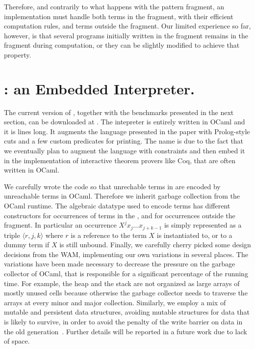 \documentclass{llncs}
\begin{document}
Therefore, and contrarily to what happens with the pattern fragment, an
implementation must handle both terms in the fragment, with their efficient
computation rules, and terms outside the fragment. Our limited experience so
far, however, is that several programs initially written in the fragment
remains in the fragment during computation, or they can be slightly modified
to achieve that property.

\section{\elpi: an Embedded \lp{} Interpreter.}\label{sec:elpi}
The current version of \elpi, together with the benchmarks presented in
the next section, can be downloaded at . The intepreter
is entirely written in OCaml and it is  lines long. It augments the language presented in the paper with Prolog-style cuts and a few custom predicates for printing. The name is due to the fact that we eventually plan to augment the language with constraints and then embed it in the implementation of interactive theorem provers like Coq, that are often written in OCaml.

We carefully wrote the code so that unrechable terms in \lp{} are encoded by unreachable terms in OCaml. Therefore we inherit garbage collection from the OCaml runtime. The algebraic datatype used to encode terms has different constructors for occurrences of terms in the \frag, and for occurrences outside the fragment. In particular an occurrence $X^j x_j \ldots x_{j+k-1}$ is simply represented as a triple $\langle r,j,k\rangle$ where $r$ is a reference to the term
$X$ is instantiated to, or to a dummy term if $X$ is still unbound. Finally, we carefully cherry picked some design decisions from the WAM, implementing our own variations in several places. The variations have been made necessary to decrease the pressure on the garbage collector of OCaml, that is responsible for a significant percentage of the running time. For example, the heap and the stack are not organized as large arrays of mostly unused cells because otherwise the garbage collector needs to traverse the arrays at every minor and major collection. Similarly, we employ a mix of mutable and persistent data structures, avoiding mutable structures for data that is likely to survive, in order to avoid the penalty of the write barrier on data in the old generation~\cite{???}.
Further details will be reported in a future work due to lack of space.
\end{document}
